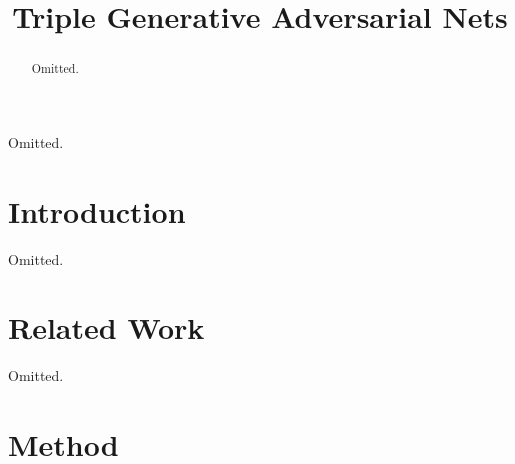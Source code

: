 \documentclass[conference]{IEEEtran}
\begin{document}
\title{Triple Generative Adversarial Nets
}

\author{
}


\maketitle

\begin{abstract}
Omitted.
\end{abstract}

\begin{IEEEkeywords}
Omitted.
\end{IEEEkeywords}

\section{Introduction}
Omitted.

\section{Related Work}
Omitted.

\section{Method}
\end{document}
